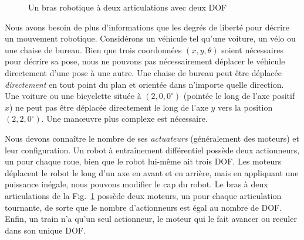 \begin{figure}
\begin{center}
\end{center}
\caption{Un bras robotique à deux articulations avec deux DOF}\label{fig.two-link}
\end{figure}

Nous avons besoin de plus d'informations que les degrés de liberté pour décrire un mouvement robotique. Considérons un véhicule tel qu'une voiture, un vélo ou une chaise de bureau. Bien que trois coordonnées $(x,y,\theta)$ soient nécessaires pour décrire sa pose, nous ne pouvons pas nécessairement déplacer le véhicule directement d'une pose à une autre. Une chaise de bureau peut être déplacée \emph{directement} en tout point du plan et orientée dans n'importe quelle direction. Une voiture ou une bicyclette située à $(2,0,0^\circ)$ (pointée le long de l'axe positif $x$) ne peut pas être déplacée directement le long de l'axe $y$ vers la position $(2,2,0^\circ)$. Une manœuvre plus complexe est nécessaire.

Nous devons connaître le nombre de ses \emph{actuateurs} (généralement des moteurs) et leur configuration. Un robot à entraînement différentiel possède deux actionneurs, un pour chaque roue, bien que le robot lui-même ait trois DOF. Les moteurs déplacent le robot le long d'un axe en avant et en arrière, mais en appliquant une puissance inégale, nous pouvons modifier le cap du robot. Le bras à deux articulations de la Fig.~\ref{fig.two-link} possède deux moteurs, un pour chaque articulation tournante, de sorte que le nombre d'actionneurs est égal au nombre de DOF. Enfin, un train n'a qu'un seul actionneur, le moteur qui le fait avancer ou reculer dans son unique DOF.


